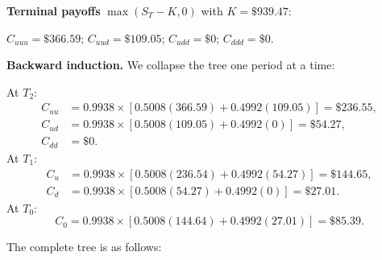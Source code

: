 \documentclass[12pt, a4paper]{article}
\begin{document}
\textbf{Terminal payoffs} $\max(S_T - K, 0)$ with $K = \$939.47$:
\begin{center}
$C_{uuu} = \$366.59$; \quad $C_{uud} = \$109.05$; \quad $C_{udd} = \$0$; \quad $C_{ddd} = \$0$.
\end{center}
 
\textbf{Backward induction.} We collapse the tree one period at a time:
 
At $T_2$:
\begin{align*}
C_{uu} &= 0.9938 \times [0.5008(366.59) + 0.4992(109.05)] = \$236.55, \\
C_{ud} &= 0.9938 \times [0.5008(109.05) + 0.4992(0)] = \$54.27, \\
C_{dd} &= \$0.
\end{align*}
At $T_1$:
\begin{align*}
C_{u} &= 0.9938 \times [0.5008(236.54) + 0.4992(54.27)] = \$144.65, \\
C_{d} &= 0.9938 \times [0.5008(54.27) + 0.4992(0)] = \$27.01.
\end{align*}
At $T_0$:
\begin{equation*}
C_0 = 0.9938 \times [0.5008(144.64) + 0.4992(27.01)] = \mathbf{\$85.39}.
\end{equation*}

The complete tree is as follows:
\end{document}
